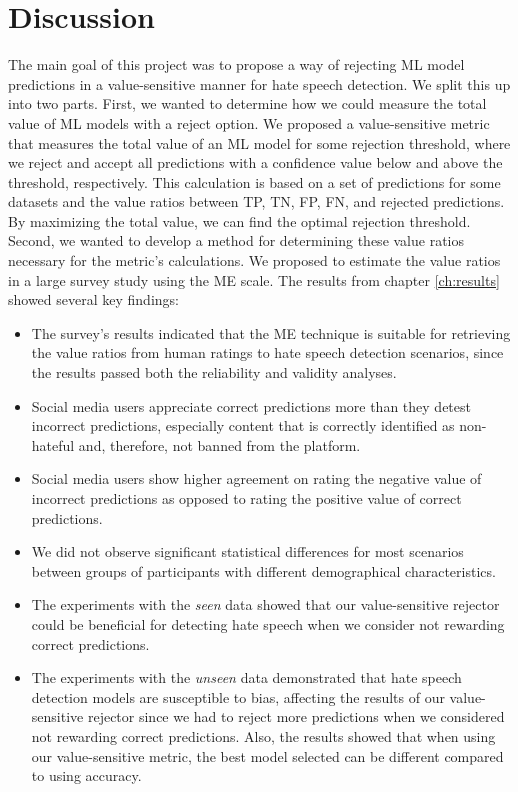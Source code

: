 \chapter{Discussion}
The main goal of this project was to propose a way of rejecting ML model predictions in a value-sensitive manner for hate speech detection.
%
We split this up into two parts.
%
First, we wanted to determine how we could measure the total value of ML models with a reject option.
%
We proposed a value-sensitive metric that measures the total value of an ML model for some rejection threshold, where we reject and accept all predictions with a confidence value below and above the threshold, respectively.
%
This calculation is based on a set of predictions for some datasets and the value ratios between TP, TN, FP, FN, and rejected predictions.
%
By maximizing the total value, we can find the optimal rejection threshold.
%
Second, we wanted to develop a method for determining these value ratios necessary for the metric's calculations.
%
We proposed to estimate the value ratios in a large survey study using the ME scale.
%
The results from chapter \ref{ch:results} showed several key findings:
\begin{itemize}
    \item The survey's results indicated that the ME technique is suitable for retrieving the value ratios from human ratings to hate speech detection scenarios, since the results passed both the reliability and validity analyses.
    \item Social media users appreciate correct predictions more than they detest incorrect predictions, especially content that is correctly identified as non-hateful and, therefore, not banned from the platform.
    \item Social media users show higher agreement on rating the negative value of incorrect predictions as opposed to rating the positive value of correct predictions.
    \item We did not observe significant statistical differences for most scenarios between groups of participants with different demographical characteristics.
    \item The experiments with the \emph{seen} data showed that our value-sensitive rejector could be beneficial for detecting hate speech when we consider not rewarding correct predictions.
    \item The experiments with the \emph{unseen} data demonstrated that hate speech detection models are susceptible to bias, affecting the results of our value-sensitive rejector since we had to reject more predictions when we considered not rewarding correct predictions. Also, the results showed that when using our value-sensitive metric, the best model selected can be different compared to using accuracy.
\end{itemize}
%

